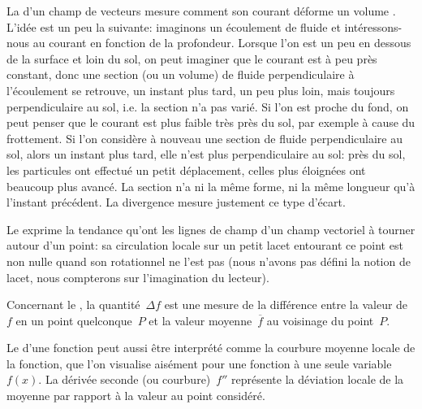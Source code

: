 La  d'un champ de vecteurs mesure comment son courant déforme un volume .
{\small L'idée est un peu la suivante: imaginons un écoulement de fluide et intéressons-nous au courant en fonction de la profondeur. Lorsque l'on est un peu en dessous de la surface et loin du sol, on peut imaginer que le courant est à peu près constant, donc une section (ou un volume) de fluide perpendiculaire à l'écoulement se retrouve, un instant plus tard, un peu plus loin, mais toujours perpendiculaire au sol, i.e. la section n'a pas varié. Si l'on est proche du fond, on peut penser que le courant est plus faible très près du sol, par exemple à cause du frottement. Si l'on considère à nouveau une section de fluide perpendiculaire au sol, alors un instant plus tard, elle n'est plus perpendiculaire au sol: près du sol, les particules ont effectué un petit déplacement, celles plus éloignées ont beaucoup plus avancé. La section n'a ni la même forme, ni la même longueur qu'à l'instant précédent. La divergence mesure justement ce type d'écart.}


Le  exprime la tendance qu'ont les lignes de champ d'un champ vectoriel à tourner autour d'un point: sa circulation locale sur un petit lacet entourant ce point est non nulle quand son rotationnel ne l'est pas (nous n'avons pas défini la notion de lacet, nous compterons sur l'imagination du lecteur). 

\medskip
Concernant le , la quantité~$\Delta f$ est une mesure de la différence entre la valeur de~$f$ en un point quelconque~$P$ et la valeur moyenne~$\overline{f}$ au voisinage du point~$P$.

Le  d'une fonction peut aussi être interprété comme la courbure moyenne locale de la fonction, que l'on visualise aisément pour une fonction à une seule variable~$f(x)$.
La dérivée seconde (ou courbure)~$f''$ représente la déviation locale de la moyenne par rapport à la valeur au point considéré.

